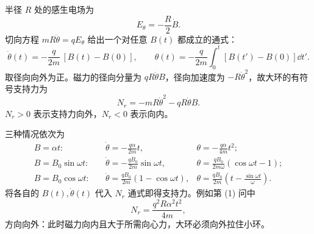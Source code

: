 \begin{xesolution}
半径 $R$ 处的感生电场为
\begin{equation}
  E_\theta=-\frac R2\dot B.
\end{equation}
切向方程 $mR\ddot\theta=qE_\theta$ 给出一个对任意 $B(t)$ 都成立的通式：
\begin{equation}
  \boxed{\dot\theta(t)=-\frac q{2m}\,[B(t)-B(0)]},
  \qquad
  \boxed{\theta(t)=-\frac q{2m}\int_0^t[B(t')-B(0)]\dd t'}.
\end{equation}
取径向向外为正。磁力的径向分量为 $qR\dot\theta B$，径向加速度为 $-R\dot\theta^2$，故大环的有符号支持力为
\begin{equation}
  \boxed{N_r=-mR\dot\theta^2-qR\dot\theta B}.
\end{equation}
$N_r>0$ 表示支持力向外，$N_r<0$ 表示向内。

三种情况依次为
\begin{align}
  B=\alpha t:\quad
  &\boxed{\dot\theta=-\frac{q\alpha}{2m}t},
  &\boxed{\theta=-\frac{q\alpha}{4m}t^2};\\
  B=B_0\sin\omega t:\quad
  &\boxed{\dot\theta=-\frac{qB_0}{2m}\sin\omega t},
  &\boxed{\theta=\frac{qB_0}{2m\omega}(\cos\omega t-1)};\\
  B=B_0\cos\omega t:\quad
  &\boxed{\dot\theta=\frac{qB_0}{2m}(1-\cos\omega t)},
  &\boxed{\theta=\frac{qB_0}{2m}\left(t-\frac{\sin\omega t}{\omega}\right)}.
\end{align}
将各自的 $B(t),\dot\theta(t)$ 代入 $N_r$ 通式即得支持力。例如第 (1) 问中
\begin{equation}
  \boxed{N_r=\frac{q^2R\alpha^2t^2}{4m}},
\end{equation}
方向向外：此时磁力向内且大于所需向心力，大环必须向外拉住小环。

\chargedRingDiagram
\end{xesolution}
